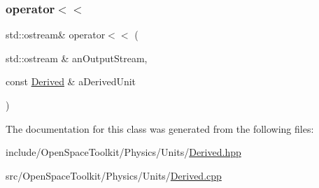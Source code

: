 \subsubsection{\texorpdfstring{operator$<$$<$}{operator<<}}
{\footnotesize\ttfamily std\+::ostream\& operator$<$$<$ (\begin{DoxyParamCaption}\item[{std\+::ostream \&}]{an\+Output\+Stream,  }\item[{const \hyperlink{classostk_1_1physics_1_1units_1_1_derived}{Derived} \&}]{a\+Derived\+Unit }\end{DoxyParamCaption})\hspace{0.3cm}{\ttfamily [friend]}}



The documentation for this class was generated from the following files\+:\begin{DoxyCompactItemize}
\item 
include/\+Open\+Space\+Toolkit/\+Physics/\+Units/\hyperlink{_derived_8hpp}{Derived.\+hpp}\item 
src/\+Open\+Space\+Toolkit/\+Physics/\+Units/\hyperlink{_derived_8cpp}{Derived.\+cpp}\end{DoxyCompactItemize}
